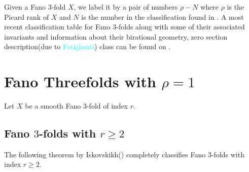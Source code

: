 \documentclass[11pt]{amsart}
\theoremstyle{plain}
\theoremstyle{definition}
\theoremstyle{expl}
\begin{document}
\noindent Given a Fano $3$-fold $X$, we label it by a pair of numbers $\rho-N$ where $\rho$ is the Picard rank of $X$ and $N$ is the number in the classification found in \cite{FanoV}. A most recent classification table for Fano $3$-folds along with some of their associated invariants and information about their birational geometry, zero section description(due to \textcolor{cyan}{Fatighenti}) class can be found on \cite{Fano}.

	  
\section{Fano Threefolds with $\rho =1$}
\noindent Let $X$ be a smooth Fano $3$-fold of index $r$. 
\subsection{Fano $3$-folds with $r\geq2$}
The following theorem by Iskovskikh(\cite{Isk77}) completely classifies Fano $3$-folds with index $r\geq 2$. 
\end{document}
